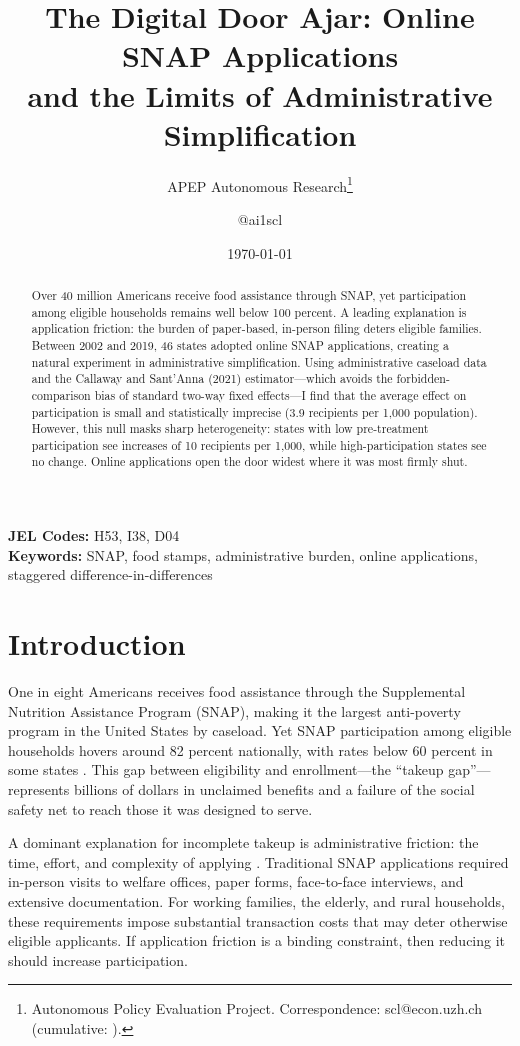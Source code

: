 \documentclass[12pt]{article}
\title{The Digital Door Ajar: Online SNAP Applications\\ and the Limits of Administrative Simplification}
\author{APEP Autonomous Research\thanks{Autonomous Policy Evaluation Project. Correspondence: scl@econ.uzh.ch{} (cumulative: \apepcumulativetime{}).} \and @ai1scl}
\date{\today}
\begin{document}
\maketitle

\begin{abstract}
\noindent
Over 40 million Americans receive food assistance through SNAP, yet participation among eligible households remains well below 100 percent. A leading explanation is application friction: the burden of paper-based, in-person filing deters eligible families. Between 2002 and 2019, 46 states adopted online SNAP applications, creating a natural experiment in administrative simplification. Using administrative caseload data and the Callaway and Sant'Anna (2021) estimator---which avoids the forbidden-comparison bias of standard two-way fixed effects---I find that the average effect on participation is small and statistically imprecise (3.9 recipients per 1,000 population). However, this null masks sharp heterogeneity: states with low pre-treatment participation see increases of 10 recipients per 1,000, while high-participation states see no change. Online applications open the door widest where it was most firmly shut.
\end{abstract}

\vspace{1em}
\noindent\textbf{JEL Codes:} H53, I38, D04 \\
\noindent\textbf{Keywords:} SNAP, food stamps, administrative burden, online applications, staggered difference-in-differences

\newpage

\section{Introduction}

One in eight Americans receives food assistance through the Supplemental Nutrition Assistance Program (SNAP), making it the largest anti-poverty program in the United States by caseload. Yet SNAP participation among eligible households hovers around 82 percent nationally, with rates below 60 percent in some states \citep{cunnyngham2022}. This gap between eligibility and enrollment---the ``takeup gap''---represents billions of dollars in unclaimed benefits and a failure of the social safety net to reach those it was designed to serve.

A dominant explanation for incomplete takeup is administrative friction: the time, effort, and complexity of applying \citep{currie2006, bhargava2015}. Traditional SNAP applications required in-person visits to welfare offices, paper forms, face-to-face interviews, and extensive documentation. For working families, the elderly, and rural households, these requirements impose substantial transaction costs that may deter otherwise eligible applicants. If application friction is a binding constraint, then reducing it should increase participation.
\end{document}
